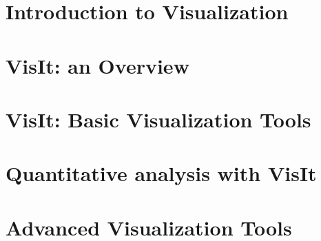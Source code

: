 \documentclass[xcolor=svgnames]{beamer}
\providecommand{\sectionpage}{\Large\centering \bf\mediumblue\insertsection}
\begin{document}
\section{Introduction to Visualization}
\introEnv
\frame{\sectionpage}
  
\resetEnv

\section{VisIt: an Overview}
\basicEnv
\frame{\sectionpage}
 
\resetEnv

\section{VisIt: Basic Visualization Tools}
\basicEnv
\frame{\sectionpage}
 
\resetEnv

\section{Quantitative analysis with VisIt}
\normalEnv
\frame{\sectionpage}
 
\resetEnv

\section{Advanced Visualization Tools}
\advEnv
\frame{\sectionpage}
 
\resetEnv

\end{document}
